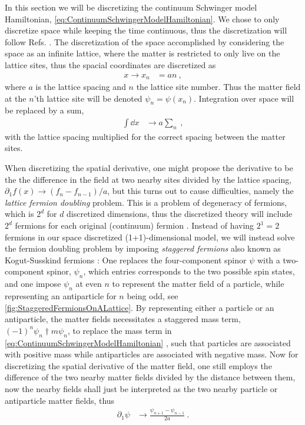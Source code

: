 \documentclass[../main.tex]{subfiles} %
\begin{document}
In this section we will be discretizing the continuum Schwinger model Hamiltonian, \cref{eq:ContinuumSchwingerModelHamiltonian}. We chose to only discretize space while keeping the time continuous, thus the discretization will follow Refs. \cite{sriganish_PhD_LatticeSchwingerModel_2001, smit_introToQuantumFieldsOnALattice_2003}. The discretization of the space accomplished by considering the space as an infinite lattice, where the matter is restricted to only live on the lattice sites, thus the spacial coordinates are discretized as
\begin{align}
    x \rightarrow x_n &= an \: ,
\end{align}
where $a$ is the lattice spacing and $n$ the lattice site number. Thus the matter field at the $n$'th lattice site will be denoted $\psi_n = \psi(x_n)$. Integration over space will be replaced by a sum,
\begin{align}
    \int \dd{x} &\rightarrow a \sum_n \: ,
\end{align}
with the lattice spacing multiplied for the correct spacing between the matter sites.

When discretizing the spatial derivative, one might propose the derivative to be the the difference in the field at two nearby sites divided by the lattice spacing, $\partial_1 f(x) \rightarrow (f_n - f_{n - 1}) / a$, but this turns out to cause difficulties, namely the \emph{lattice fermion doubling} problem. This is a problem of degeneracy of fermions, which is $2^d$ for $d$ discretized dimensions, thus the discretized theory will include $2^d$ fermions for each original (continuum) fermion \cite{GoswamiBandyopadhyay_FermionDoubling_1997}. Instead of having $2^1 = 2$ fermions in our space discretized (1+1)-dimensional model, we will instead solve the fermion doubling problem by imposing \emph{staggered fermions} also known as Kogut-Susskind fermions \cite{susskind_latticeFermions_1977, banksSusskindKogut_StrongCoupling_1976}: One replaces the four-component spinor $\psi$ with a two-component spinor, $\psi_n$, which entries corresponds to the two possible spin states, and one impose $\psi_n$ at even $n$ to represent the matter field of a particle, while representing an antiparticle for $n$ being odd, see \cref{fig:StaggeredFermionsOnALattice}. By representing either a particle or an antiparticle, the matter fields necessitates a staggered mass term, $(-1)^n \psi_n\dagger m \psi_n$, to replace the mass term in \cref{eq:ContinuumSchwingerModelHamiltonian} \cite{susskind_latticeFermions_1977}, such that particles are associated with positive mass while antiparticles are associated with negative mass. Now for discretizing the spatial derivative of the matter field, one still employs the difference of the two nearby matter fields divided by the distance between them, now the nearby fields shall just be interpreted as the two nearby particle or antiparticle matter fields, thus \cite{susskind_latticeFermions_1977}
\begin{align}
    \partial_1 \psi &\rightarrow \frac{\psi_{n+1} - \psi_{n-1}}{2a} \: .
\end{align}
\end{document}
